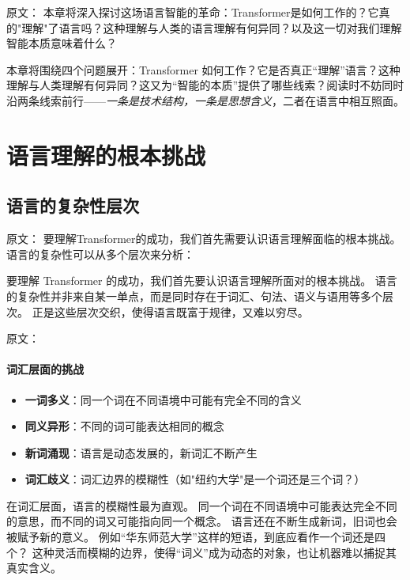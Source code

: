 原文：
本章将深入探讨这场语言智能的革命：Transformer是如何工作的？它真的"理解"了语言吗？这种理解与人类的语言理解有何异同？以及这一切对我们理解智能本质意味着什么？

本章将围绕四个问题展开：Transformer 如何工作？它是否真正“理解”语言？这种理解与人类理解有何异同？这又为“智能的本质”提供了哪些线索？阅读时不妨同时沿两条线索前行——\emph{一条是技术结构，一条是思想含义}，二者在语言中相互照面。

\section{语言理解的根本挑战}

\subsection{语言的复杂性层次}



原文：
要理解Transformer的成功，我们首先需要认识语言理解面临的根本挑战。语言的复杂性可以从多个层次来分析：

要理解 Transformer 的成功，我们首先要认识语言理解所面对的根本挑战。  
语言的复杂性并非来自某一单点，而是同时存在于词汇、句法、语义与语用等多个层次。  
正是这些层次交织，使得语言既富于规律，又难以穷尽。  



原文：
\paragraph{词汇层面的挑战}
\begin{itemize}
\item \textbf{一词多义}：同一个词在不同语境中可能有完全不同的含义
\item \textbf{同义异形}：不同的词可能表达相同的概念
\item \textbf{新词涌现}：语言是动态发展的，新词汇不断产生
\item \textbf{词汇歧义}：词汇边界的模糊性（如"纽约大学"是一个词还是三个词？）
\end{itemize}

在词汇层面，语言的模糊性最为直观。  
同一个词在不同语境中可能表达完全不同的意思，而不同的词又可能指向同一个概念。  
语言还在不断生成新词，旧词也会被赋予新的意义。  
例如“华东师范大学”这样的短语，到底应看作一个词还是四个？  
这种灵活而模糊的边界，使得“词义”成为动态的对象，也让机器难以捕捉其真实含义。  



